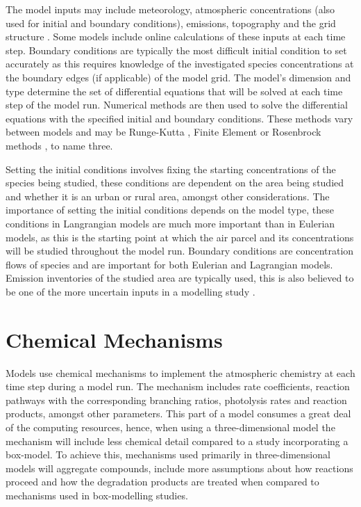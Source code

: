 The model inputs may include meteorology, atmospheric concentrations (also used for initial and boundary conditions), 
emissions, topography and the grid structure \citep{Russell:2000}. Some models include online calculations of these inputs at 
each time step. Boundary conditions are typically the most difficult initial condition to set accurately as this requires 
knowledge of the investigated species concentrations at the boundary edges (if applicable) of the model grid. The model's 
dimension and type determine the set of differential equations that will be solved at each time step of the model run. 
Numerical methods are then used to solve the differential equations with the specified initial and boundary conditions. These 
methods vary between models and may be Runge-Kutta \citep{Sandu:1997b}, Finite Element \citep{Russell:2000} or Rosenbrock methods
\citep{Sandu:1997a}, to name three.

Setting the initial conditions involves fixing the starting concentrations of the species being studied, these conditions are 
dependent on the area being studied and whether it is an urban or rural area, amongst other considerations. The importance of 
setting the initial conditions depends on the model type, these conditions in Langrangian models are much more important than 
in Eulerian models, as this is the starting point at which the air parcel and its concentrations will be studied throughout the
model run. Boundary conditions are concentration flows of species and are important for both Eulerian and Lagrangian models. 
Emission inventories of the studied area are typically used, this is also believed to be one of the more uncertain inputs in a 
modelling study \citep{Russell:2000}.

\section{Chemical Mechanisms}
Models use chemical mechanisms to implement the atmospheric chemistry at each time step during a model run. The mechanism 
includes rate coefficients, reaction pathways with the corresponding branching ratios, photolysis rates and reaction products, 
amongst other parameters. This part of a model consumes a great deal of the computing resources, hence, when using a 
three-dimensional model the mechanism will include less chemical detail compared to a study incorporating a box-model. To 
achieve this, mechanisms used primarily in three-dimensional models will aggregate compounds, include more assumptions about 
how reactions proceed and how the degradation products are treated when compared to mechanisms used in box-modelling studies.

